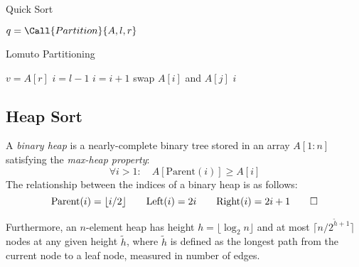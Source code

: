 \begin{algorithm}[h!]
    \caption{Quick Sort}
    \label{alg:quick_sort}
\begin{algorithmic}[1]
            \State $q = \Call{Partition}{A, l, r}$
            \State {}
            \State {}
        \EndIf
    \EndFunction
\end{algorithmic}
\end{algorithm}
\begin{algorithm}[h!]
    \caption{Lomuto Partitioning}
    \label{alg:lomuto_partition}
\begin{algorithmic}[1]
        \State $v = A[r]$ 
        \State $i = l - 1$ 
                \State $i = i + 1$
                \State swap $A[i]$ and $A[j]$
            \EndIf
        \EndFor
        \State \Return $i$ 
    \EndFunction
\end{algorithmic}
\end{algorithm}
    




\subsection{Heap Sort}
\label{subsec:heap_sort}
\begin{definition}[Heap]
A \emph{binary heap} is a nearly-complete binary tree stored in an array \(A[1:n]\) satisfying the \emph{max-heap property}:
\[
\forall i>1:\quad A[\mathrm{Parent}(i)] \ge A[i]
\]
The relationship between the indices of a binary heap is as follows:
\[
\mathrm{Parent}(i)=\lfloor i/2\rfloor \qquad
\mathrm{Left}(i)=2i \qquad
\mathrm{Right}(i)=2i+1 \qedhere
\]
\end{definition}
Furthermore, an $n$-element heap has height $h=\lfloor\log_2 n\rfloor$ and at most $\lceil n/2^{\tilde{h}+1}\rceil$ nodes at any given height $\tilde{h}$, where $\tilde{h}$ is defined as the longest path from the current node to a leaf node, measured in number of edges.


\newcommand{\arraycolor}{\color{arraycolor}}


